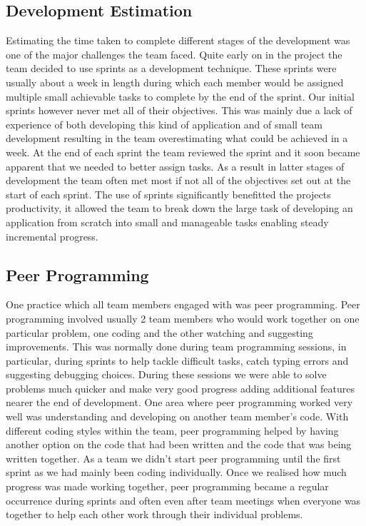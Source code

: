 \documentclass{l3proj}
\begin{document}
\subsection{Development Estimation}
Estimating the time taken to complete different stages of the development was one of the major challenges the team faced. Quite early on in the project the team decided to use sprints as a development technique. These sprints were usually about a week in length during which each member would be assigned multiple small achievable tasks to complete by the end of the sprint. Our initial sprints however never met all of  their objectives. This was mainly due a lack of experience of  both developing this kind of application and of small team development resulting in the team overestimating what could be achieved in a week. At the end of each sprint the team reviewed the sprint and it soon became apparent that we needed to better assign tasks. As a result in latter stages of development the team often met most if not all of  the objectives set out at the start of each sprint. The use of sprints significantly benefitted the projects productivity, it allowed the team to break down the large task of developing an application from scratch into small and manageable tasks enabling steady incremental progress.

\subsection{Peer Programming}
One practice which all team members engaged with was peer programming. Peer programming involved usually 2 team members who would work together on one particular problem, one coding and the other watching and suggesting improvements. This was normally done during team programming sessions, in particular, during sprints to help tackle difficult tasks, catch typing errors and suggesting debugging choices. During these sessions we were able to solve problems much quicker and make very good progress adding additional features nearer the end of development. One area where peer programming worked very well was understanding and developing on another team member's code. With different coding styles within the team, peer programming helped by having another option on the code that had been written and the code that was being written together. 
As a team we didn't start peer programming until the first sprint as we had mainly been coding individually. Once we realised how much progress was made working together, peer programming became a regular occurrence during sprints and often even after team meetings when everyone was together to help each other work through their individual problems.
\end{document}
